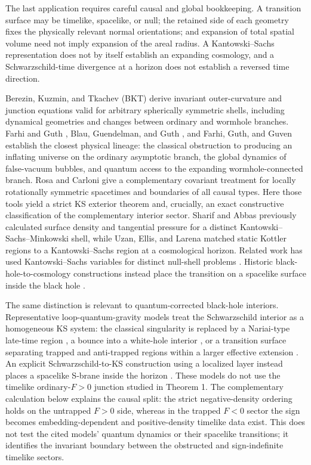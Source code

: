 \documentclass[pdflatex,sn-mathphys-num]{sn-jnl}
\begin{document}
The last application requires careful causal and global bookkeeping. A transition surface may be timelike, spacelike, or null; the retained side of each geometry fixes the physically relevant normal orientations; and expansion of total spatial volume need not imply expansion of the areal radius. A Kantowski--Sachs representation does not by itself establish an expanding cosmology, and a Schwarzschild-time divergence at a horizon does not establish a reversed time direction.


Berezin, Kuzmin, and Tkachev (BKT) \cite{ref2} derive invariant outer-curvature and junction equations valid for arbitrary spherically symmetric shells, including dynamical geometries and changes between ordinary and wormhole branches. Farhi and Guth \cite{ref3}, Blau, Guendelman, and Guth \cite{ref4}, and Farhi, Guth, and Guven \cite{ref5} establish the closest physical lineage: the classical obstruction to producing an inflating universe on the ordinary asymptotic branch, the global dynamics of false-vacuum bubbles, and quantum access to the expanding wormhole-connected branch. Rosa and Carloni \cite{ref6} give a complementary covariant treatment for locally rotationally symmetric spacetimes and boundaries of all causal types. Here those tools yield a strict KS exterior theorem and, crucially, an exact constructive classification of the complementary interior sector. Sharif and Abbas \cite{ref18} previously calculated surface density and tangential pressure for a distinct Kantowski--Sachs--Minkowski shell, while Uzan, Ellis, and Larena \cite{ref19} matched static Kottler regions to a Kantowski--Sachs region at a cosmological horizon. Related work has used Kantowski--Sachs variables for distinct null-shell problems \cite{ref7}. Historic black-hole-to-cosmology constructions instead place the transition on a spacelike surface inside the black hole \cite{ref8,ref9}.


The same distinction is relevant to quantum-corrected black-hole interiors. Representative loop-quantum-gravity models treat the Schwarzschild interior as a homogeneous KS system: the classical singularity is replaced by a Nariai-type late-time region \cite{ref14}, a bounce into a white-hole interior \cite{ref15}, or a transition surface separating trapped and anti-trapped regions within a larger effective extension \cite{ref16}. An explicit Schwarzschild-to-KS construction using a localized layer instead places a spacelike S-brane inside the horizon \cite{ref17}. These models do not use the timelike ordinary-\(F>0\) junction studied in Theorem 1. The complementary calculation below explains the causal split: the strict negative-density ordering holds on the untrapped \(F>0\) side, whereas in the trapped \(F<0\) sector the sign becomes embedding-dependent and positive-density timelike data exist. This does not test the cited models' quantum dynamics or their spacelike transitions; it identifies the invariant boundary between the obstructed and sign-indefinite timelike sectors.
\end{document}
